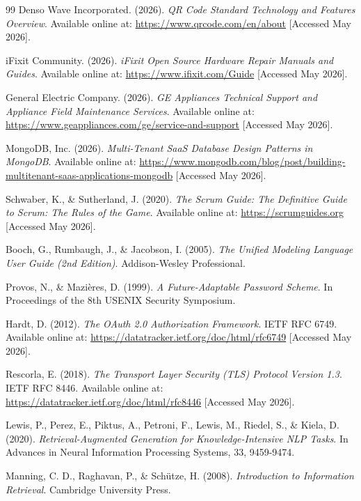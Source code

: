 \documentclass[12pt,a4paper]{report}
\begin{document}
\begin{thebibliography}{99}
Denso Wave Incorporated. (2026). \textit{QR Code Standard Technology and Features Overview}. Available online at: \url{https://www.qrcode.com/en/about} [Accessed May 2026].

iFixit Community. (2026). \textit{iFixit Open Source Hardware Repair Manuals and Guides}. Available online at: \url{https://www.ifixit.com/Guide} [Accessed May 2026].

General Electric Company. (2026). \textit{GE Appliances Technical Support and Appliance Field Maintenance Services}. Available online at: \url{https://www.geappliances.com/ge/service-and-support} [Accessed May 2026].

MongoDB, Inc. (2026). \textit{Multi-Tenant SaaS Database Design Patterns in MongoDB}. Available online at: \url{https://www.mongodb.com/blog/post/building-multitenant-saas-applications-mongodb} [Accessed May 2026].

Schwaber, K., \& Sutherland, J. (2020). \textit{The Scrum Guide: The Definitive Guide to Scrum: The Rules of the Game}. Available online at: \url{https://scrumguides.org} [Accessed May 2026].

Booch, G., Rumbaugh, J., \& Jacobson, I. (2005). \textit{The Unified Modeling Language User Guide (2nd Edition)}. Addison-Wesley Professional.

Provos, N., \& Mazières, D. (1999). \textit{A Future-Adaptable Password Scheme}. In Proceedings of the 8th USENIX Security Symposium.

Hardt, D. (2012). \textit{The OAuth 2.0 Authorization Framework}. IETF RFC 6749. Available online at: \url{https://datatracker.ietf.org/doc/html/rfc6749} [Accessed May 2026].

Rescorla, E. (2018). \textit{The Transport Layer Security (TLS) Protocol Version 1.3}. IETF RFC 8446. Available online at: \url{https://datatracker.ietf.org/doc/html/rfc8446} [Accessed May 2026].

Lewis, P., Perez, E., Piktus, A., Petroni, F., Lewis, M., Riedel, S., \& Kiela, D. (2020). \textit{Retrieval-Augmented Generation for Knowledge-Intensive NLP Tasks}. In Advances in Neural Information Processing Systems, 33, 9459-9474.

Manning, C. D., Raghavan, P., \& Schütze, H. (2008). \textit{Introduction to Information Retrieval}. Cambridge University Press.


\end{thebibliography}
\end{document}
